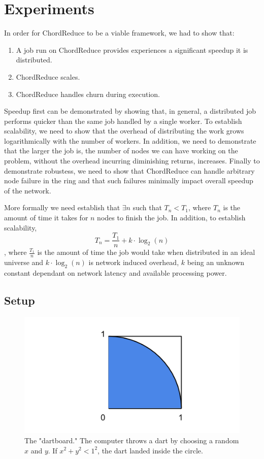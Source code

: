 \documentclass[10pt, conference, compsocconf]{IEEEtran}
\begin{document}
\section{Experiments}
In order for ChordReduce to be a viable framework, we had to show that:
\begin{enumerate}
    \item A job run on ChordReduce provides experiences a significant speedup it is distributed.
    \item ChordReduce scales.
    \item ChordReduce handles churn during execution.
\end{enumerate}
Speedup first can be demonstrated by showing that, in general, a distributed job performs quicker than the same job handled by a single worker.  To establish scalability, we need to show that the overhead of distributing the work grows logarithmically with the number of workers.  In addition, we need to demonstrate that the larger the job is, the number of nodes we can have working on the problem, without the overhead incurring diminishing returns, increases. Finally to demonstrate robustess, we need to show that ChordReduce can handle arbitrary node failure in the ring and that such failures minimally impact overall speedup of the network.


More formally we need establish that $\exists n$ such that $T_{n} < T_{1}$, where $T_{n}$ is the amount of time it takes for $n$ nodes to finish the job.  In addition, to establish scalability,
$$T_{n} = \frac{T_{1}}{n} + k \cdot \log_{2}(n)$$, where $\frac{T_{1}}{n}$ is the amount of time the job would take when distributed in an ideal universe and $k \cdot \log_{2}(n)$ is network induced overhead, $k$ being an unknown constant dependant on network latency and available processing power.


\subsection{Setup}
\begin{figure}
    \includegraphics[width=\linewidth]{dartboard}
    \caption{The "dartboard." The computer throws a dart by choosing a random $x$ and $y$.  If $x^{2} + y^{2} < 1^{2} $, the dart landed inside the circle.}
    \label{dartboard}
\end{figure}
\end{document}
